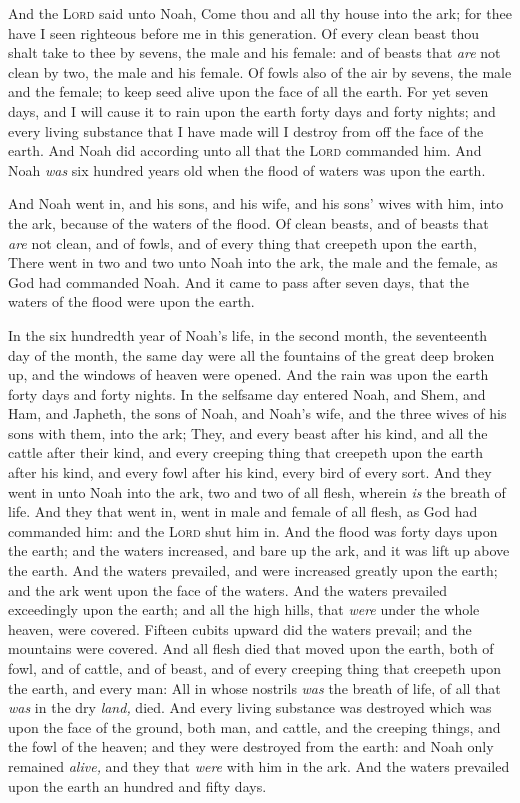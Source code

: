 \documentclass[11pt,letterpaper,oneside]{memoir}
\begin{document}
And the \textsc{Lord} said unto Noah, Come thou and all thy house into the
ark; for thee have I seen righteous before me in this generation. Of
every clean beast thou shalt take to thee by sevens, the male and his
female: and of beasts that \emph{are} not clean by two, the male and his
female. Of fowls also of the air by sevens, the male and the female; to
keep seed alive upon the face of all the earth. For yet seven days, and
I will cause it to rain upon the earth forty days and forty nights; and
every living substance that I have made will I destroy from off the face
of the earth. And Noah did according unto all that the \textsc{Lord}
commanded him. And Noah \emph{was} six hundred years old when the flood
of waters was upon the earth.

And Noah went in, and his sons, and his wife, and his sons' wives with
him, into the ark, because of the waters of the flood. Of clean beasts,
and of beasts that \emph{are} not clean, and of fowls, and of every
thing that creepeth upon the earth, There went in two and two unto Noah
into the ark, the male and the female, as God had commanded Noah. And it
came to pass after seven days, that the waters of the flood were upon
the earth.

In the six hundredth year of Noah's life, in the second month, the
seventeenth day of the month, the same day were all the fountains of the
great deep broken up, and the windows of heaven were opened. And the
rain was upon the earth forty days and forty nights. In the selfsame day
entered Noah, and Shem, and Ham, and Japheth, the sons of Noah, and
Noah's wife, and the three wives of his sons with them, into the ark;
They, and every beast after his kind, and all the cattle after their
kind, and every creeping thing that creepeth upon the earth after his
kind, and every fowl after his kind, every bird of every sort. And they
went in unto Noah into the ark, two and two of all flesh, wherein
\emph{is} the breath of life. And they that went in, went in male and
female of all flesh, as God had commanded him: and the \textsc{Lord} shut
him in. And the flood was forty days upon the earth; and the waters
increased, and bare up the ark, and it was lift up above the earth. And
the waters prevailed, and were increased greatly upon the earth; and the
ark went upon the face of the waters. And the waters prevailed
exceedingly upon the earth; and all the high hills, that \emph{were}
under the whole heaven, were covered. Fifteen cubits upward did the
waters prevail; and the mountains were covered. And all flesh died that
moved upon the earth, both of fowl, and of cattle, and of beast, and of
every creeping thing that creepeth upon the earth, and every man: All in
whose nostrils \emph{was} the breath of life, of all that \emph{was} in
the dry \emph{land,} died. And every living substance was destroyed
which was upon the face of the ground, both man, and cattle, and the
creeping things, and the fowl of the heaven; and they were destroyed
from the earth: and Noah only remained \emph{alive,} and they that
\emph{were} with him in the ark. And the waters prevailed upon the earth
an hundred and fifty days.
\end{document}
